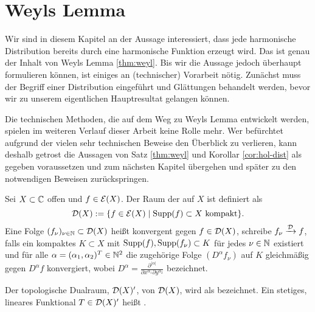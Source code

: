 
\section{Weyls Lemma}
\label{sec:Weyl}

Wir sind in diesem Kapitel an der Aussage interessiert, dass jede
harmonische Distribution bereits durch eine harmonische Funktion
erzeugt wird. Das ist genau der Inhalt von Weyls Lemma
\ref{thm:weyl}. Bis wir die Aussage jedoch überhaupt formulieren
können, ist einiges an (technischer) Vorarbeit nötig. Zunächst muss
der Begriff einer Distribution eingeführt und Glättungen behandelt
werden, bevor wir zu unserem eigentlichen Hauptresultat gelangen
können.

Die technischen Methoden, die auf dem Weg zu Weyls Lemma entwickelt
werden, spielen im weiteren Verlauf dieser Arbeit keine Rolle
mehr. Wer befürchtet aufgrund der vielen sehr technischen Beweise den
Überblick zu verlieren, kann deshalb getrost die Aussagen von Satz
\ref{thm:weyl} und Korollar \ref{cor:hol-dist} als gegeben
voraussetzen und zum nächsten Kapitel übergehen und später zu den
notwendigen Beweisen zurückspringen.

\begin{defin}
  Sei $X \subset \mathbb{C}$ offen und $f \in \mathcal{E}(X)$.
  Der Raum der  auf $X$ ist definiert als
  \[
  \mathcal{D}(X) := \{ f \in \mathcal{E}(X) \mid \operatorname{Supp}(f) \subset X \text{ kompakt} \}.
  \]
  Eine Folge $(f_\nu)_{\nu \in \mathbb{N}} \subset \mathcal{D}(X)$ heißt konvergent
  gegen $f \in \mathcal{D}(X)$, schreibe $f_\nu \xrightarrow{\mathcal{D}} f$,
  falls ein kompaktes $K \subset X$ mit $\operatorname{Supp}(f), \operatorname{Supp}(f_\nu)
  \subset K$ für jedes $\nu \in \mathbb{N}$ existiert und für alle $\alpha = (\alpha_1,
  \alpha_2)^T \in \mathbb{N}^2$ die zugehörige Folge $(D^\alpha f_\nu)$ auf
  $K$ gleichmäßig gegen $D^\alpha f$ konvergiert, wobei $D^\alpha = \frac{\partial^{|\alpha|}}{\partial
    x^{\alpha_1} \partial y^{\alpha_2}}$ bezeichnet.
\end{defin}

\begin{defin}[Distribution]
  Der topologische Dualraum, $\mathcal{D}(X)'$, von $\mathcal{D}(X)$, wird als
   bezeichnet. Ein stetiges, lineares
  Funktional $T \in \mathcal{D}(X)'$ heißt .
\end{defin}

